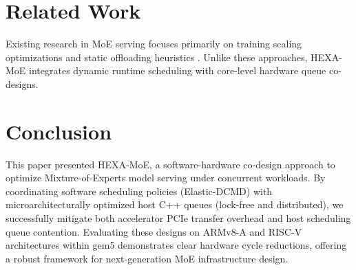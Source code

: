 \documentclass[conference]{IEEEtran}
\begin{document}
\section{Related Work}
Existing research in MoE serving focuses primarily on training scaling optimizations \cite{hwang2023tutel, rajbhandari2022deepspeedmoe} and static offloading heuristics \cite{eliseev2024fast, xue2024moeinfinity}. Unlike these approaches, HEXA-MoE integrates dynamic runtime scheduling with core-level hardware queue co-designs.

\section{Conclusion}
This paper presented HEXA-MoE, a software-hardware co-design approach to optimize Mixture-of-Experts model serving under concurrent workloads. By coordinating software scheduling policies (Elastic-DCMD) with microarchitecturally optimized host C++ queues (lock-free and distributed), we successfully mitigate both accelerator PCIe transfer overhead and host scheduling queue contention. Evaluating these designs on ARMv8-A and RISC-V architectures within gem5 demonstrates clear hardware cycle reductions, offering a robust framework for next-generation MoE infrastructure design.



\end{document}
